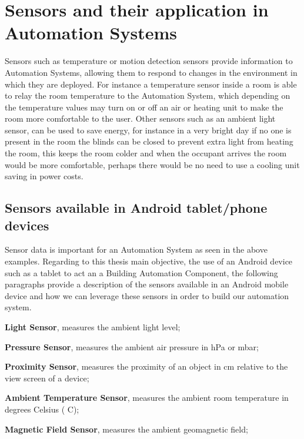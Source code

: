\section{Sensors and their application in Automation Systems} \label{ssec:num4}

Sensors such as temperature or motion detection sensors provide information to Automation Systems, allowing them to respond to changes in the environment in which they are deployed. For instance a temperature sensor inside a room is able to relay the room temperature to the Automation System, which depending on the temperature values may turn on or off an air or heating unit to make the room more comfortable to the user.
Other sensors such as an ambient light sensor, can be used to save energy, for instance in a very bright day if no one is present in the room the blinds can be closed to prevent extra light from heating the room, this keeps the room colder and when the occupant arrives the room would be more comfortable, perhaps there would be no need to use a cooling unit saving in power costs.



\subsection{Sensors available in Android tablet/phone devices}

Sensor data is important for an Automation System as seen in the above examples. Regarding to this thesis main objective, the use of an Android device such as a tablet to act an a Building Automation Component, the following paragraphs provide a description of the sensors available in an Android mobile device \cite{android:sensors} and how we can leverage these sensors in order to build our automation system.

\textbf{Light Sensor}, measures the ambient light level;

\textbf{Pressure Sensor}, measures the ambient air pressure in hPa or mbar;

\textbf{Proximity Sensor}, measures the proximity of an object in cm relative to the view screen of a device;

\textbf{Ambient Temperature Sensor}, measures the ambient room temperature in degrees Celsius ( C);

\textbf{Magnetic Field Sensor}, measures the ambient geomagnetic field;

